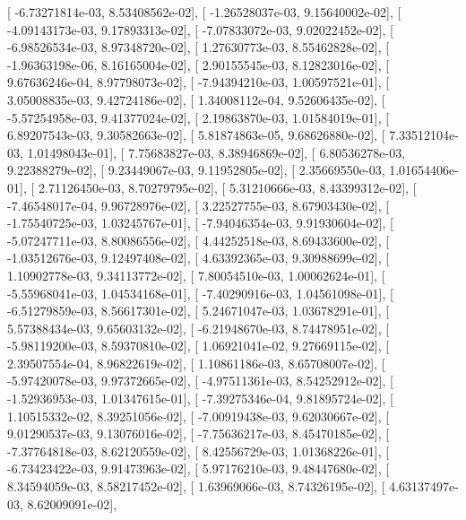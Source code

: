 \documentclass{article}
\begin{document}
       [ -6.73271814e-03,   8.53408562e-02],
       [ -1.26528037e-03,   9.15640002e-02],
       [ -4.09143173e-03,   9.17893313e-02],
       [ -7.07833072e-03,   9.02022452e-02],
       [ -6.98526534e-03,   8.97348720e-02],
       [  1.27630773e-03,   8.55462828e-02],
       [ -1.96363198e-06,   8.16165004e-02],
       [  2.90155545e-03,   8.12823016e-02],
       [  9.67636246e-04,   8.97798073e-02],
       [ -7.94394210e-03,   1.00597521e-01],
       [  3.05008835e-03,   9.42724186e-02],
       [  1.34008112e-04,   9.52606435e-02],
       [ -5.57254958e-03,   9.41377024e-02],
       [  2.19863870e-03,   1.01584019e-01],
       [  6.89207543e-03,   9.30582663e-02],
       [  5.81874863e-05,   9.68626880e-02],
       [  7.33512104e-03,   1.01498043e-01],
       [  7.75683827e-03,   8.38946869e-02],
       [  6.80536278e-03,   9.22388279e-02],
       [  9.23449067e-03,   9.11952805e-02],
       [  2.35669550e-03,   1.01654406e-01],
       [  2.71126450e-03,   8.70279795e-02],
       [  5.31210666e-03,   8.43399312e-02],
       [ -7.46548017e-04,   9.96728976e-02],
       [  3.22527755e-03,   8.67903430e-02],
       [ -1.75540725e-03,   1.03245767e-01],
       [ -7.94046354e-03,   9.91930604e-02],
       [ -5.07247711e-03,   8.80086556e-02],
       [  4.44252518e-03,   8.69433600e-02],
       [ -1.03512676e-03,   9.12497408e-02],
       [  4.63392365e-03,   9.30988699e-02],
       [  1.10902778e-03,   9.34113772e-02],
       [  7.80054510e-03,   1.00062624e-01],
       [ -5.55968041e-03,   1.04534168e-01],
       [ -7.40290916e-03,   1.04561098e-01],
       [ -6.51279859e-03,   8.56617301e-02],
       [  5.24671047e-03,   1.03678291e-01],
       [  5.57388434e-03,   9.65603132e-02],
       [ -6.21948670e-03,   8.74478951e-02],
       [ -5.98119200e-03,   8.59370810e-02],
       [  1.06921041e-02,   9.27669115e-02],
       [  2.39507554e-04,   8.96822619e-02],
       [  1.10861186e-03,   8.65708007e-02],
       [ -5.97420078e-03,   9.97372665e-02],
       [ -4.97511361e-03,   8.54252912e-02],
       [ -1.52936953e-03,   1.01347615e-01],
       [ -7.39275346e-04,   9.81895724e-02],
       [  1.10515332e-02,   8.39251056e-02],
       [ -7.00919438e-03,   9.62030667e-02],
       [  9.01290537e-03,   9.13076016e-02],
       [ -7.75636217e-03,   8.45470185e-02],
       [ -7.37764818e-03,   8.62120559e-02],
       [  8.42556729e-03,   1.01368226e-01],
       [ -6.73423422e-03,   9.91473963e-02],
       [  5.97176210e-03,   9.48447680e-02],
       [  8.34594059e-03,   8.58217452e-02],
       [  1.63969066e-03,   8.74326195e-02],
       [  4.63137497e-03,   8.62009091e-02],
\end{document}
